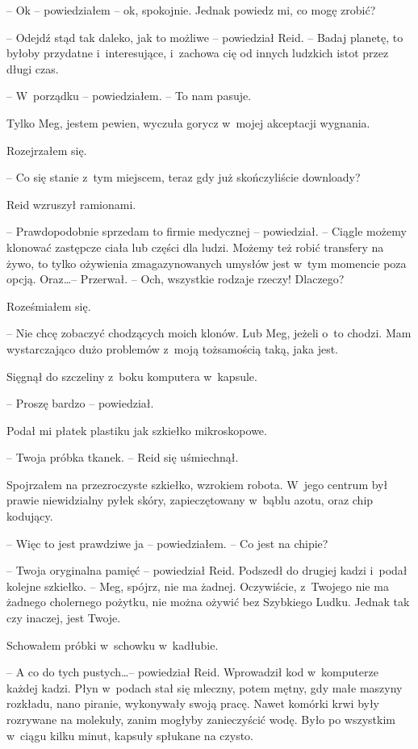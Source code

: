 \documentclass[oneside,polish,11pt,sfheadings]{mwbk}
\begin{document}
-- Ok -- powiedziałem -- ok, spokojnie. Jednak powiedz mi, co mogę zrobić?

-- Odejdź stąd tak daleko, jak to możliwe -- powiedział Reid. -- Badaj
planetę, to byłoby przydatne i~interesujące, i~zachowa cię od innych
ludzkich istot przez długi czas.

-- W~porządku -- powiedziałem. -- To nam pasuje.

Tylko Meg, jestem pewien, wyczuła gorycz w~mojej akceptacji wygnania.

Rozejrzałem się. 

-- Co się stanie z~tym miejscem, teraz gdy już
skończyliście downloady?

Reid wzruszył ramionami. 

-- Prawdopodobnie sprzedam to firmie medycznej -- powiedział. -- Ciągle możemy klonować zastępcze ciała lub części dla
ludzi. Możemy też robić transfery na żywo, to tylko ożywienia
zmagazynowanych umysłów jest w~tym momencie poza opcją. Oraz\ldots -- Przerwał. -- Och, wszystkie rodzaje rzeczy! Dlaczego?

Roześmiałem się. 

-- Nie chcę zobaczyć chodzących moich klonów. Lub Meg,
jeżeli o~to chodzi. Mam wystarczająco dużo problemów z~moją tożsamością
taką, jaka jest.

Sięgnął do szczeliny z~boku komputera w~kapsule.

-- Proszę bardzo -- powiedział.

Podał mi płatek plastiku jak szkiełko mikroskopowe.

-- Twoja próbka tkanek. -- Reid się uśmiechnął.

Spojrzałem na przezroczyste szkiełko, wzrokiem robota. W~jego centrum
był prawie niewidzialny pyłek skóry, zapieczętowany w~bąblu azotu, oraz
chip kodujący.

-- Więc to jest prawdziwe ja -- powiedziałem. -- Co jest na chipie?

-- Twoja oryginalna pamięć -- powiedział Reid. Podszedł do drugiej kadzi i~podał kolejne szkiełko. -- Meg, spójrz, nie ma żadnej. Oczywiście, z~Twojego nie ma żadnego cholernego pożytku, nie można ożywić bez
Szybkiego Ludku. Jednak tak czy inaczej, jest Twoje.

Schowałem próbki w~schowku w~kadłubie.

-- A co do tych pustych\ldots -- powiedział Reid. Wprowadził kod w~komputerze
każdej kadzi. Płyn w~podach stał się mleczny, potem mętny, gdy małe
maszyny rozkładu, nano piranie, wykonywały swoją pracę. Nawet komórki
krwi były rozrywane na molekuły, zanim mogłyby zanieczyścić wodę. Było
po wszystkim w~ciągu kilku minut, kapsuły spłukane na czysto.
\end{document}
